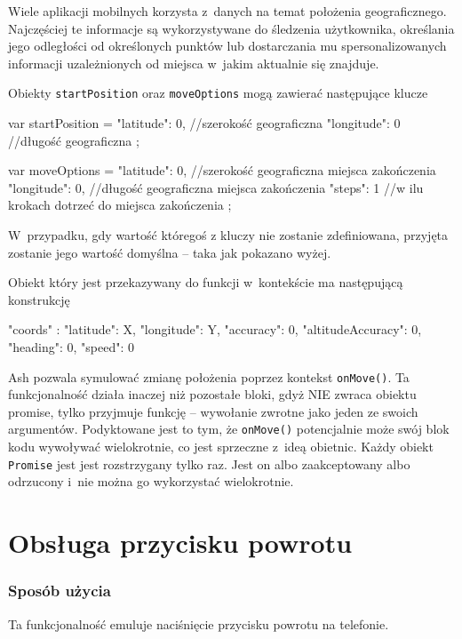 \documentclass{xmgr}
\begin{document}
Wiele aplikacji mobilnych korzysta z~danych na temat położenia geograficznego. Najczęściej te informacje są wykorzystywane do śledzenia użytkownika, określania jego odległości od określonych punktów lub dostarczania mu spersonalizowanych informacji uzależnionych od miejsca w~jakim aktualnie się znajduje. 

Obiekty \texttt{startPosition} oraz \texttt{moveOptions} mogą zawierać następujące klucze

\begin{javascriptcode}
   var startPosition = {
       "latitude": 0,  //szerokość geograficzna
       "longitude": 0  //długość geograficzna
   };
 
  var moveOptions = {
      "latitude": 0,  //szerokość geograficzna miejsca zakończenia
      "longitude": 0,  //długość geograficzna miejsca zakończenia
      "steps": 1  //w ilu krokach dotrzeć do miejsca zakończenia
  };
\end{javascriptcode}

W~przypadku, gdy wartość któregoś z kluczy nie zostanie zdefiniowana, przyjęta zostanie jego wartość domyślna -- taka jak pokazano wyżej. 

Obiekt który jest przekazywany do funkcji w~kontekście ma następującą konstrukcję 

\begin{javascriptcode}

{
  "coords" :  {
      "latitude": X, 
      "longitude": Y,
      "accuracy": 0, 
      "altitudeAccuracy": 0, 
      "heading": 0, 
      "speed": 0
   }
}

\end{javascriptcode}
Ash pozwala symulować zmianę położenia poprzez kontekst \texttt{onMove()}. Ta funkcjonalność działa inaczej niż pozostałe bloki, gdyż NIE zwraca obiektu promise, tylko przyjmuje funkcję -- wywołanie zwrotne jako jeden ze swoich argumentów. Podyktowane jest to tym, że \texttt{onMove()} potencjalnie może swój blok kodu wywoływać wielokrotnie, co jest sprzeczne z~ideą obietnic. Każdy obiekt \texttt{Promise} jest jest rozstrzygany tylko raz. Jest on albo zaakceptowany albo odrzucony i~nie można go wykorzystać wielokrotnie. 

\section{Obsługa przycisku powrotu}

\subsubsection{Sposób użycia}
Ta funkcjonalność emuluje naciśnięcie przycisku powrotu na telefonie. 
\end{document}
